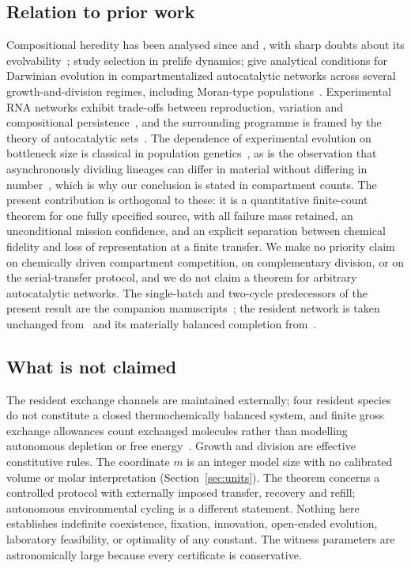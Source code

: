 \documentclass[11pt,a4paper]{article}
\theoremstyle{plain}
\theoremstyle{definition}
\theoremstyle{remark}
\begin{document}
\subsection{Relation to prior work}

Compositional heredity has been analysed since \citet{segre2000} and
\citet{szathmary1987}, with sharp doubts about its
evolvability~\citep{vasas2010,vasas2012}; \citet{nowak2008} study selection in
prelife dynamics; \citet{matsubara2026} give analytical conditions for Darwinian
evolution in compartmentalized autocatalytic networks across several
growth-and-division regimes, including Moran-type populations~\citep{moran1958}.
Experimental RNA networks exhibit trade-offs between reproduction, variation and
compositional persistence~\citep{ameta2021}, and the surrounding programme is
framed by the theory of autocatalytic
sets~\citep{kauffman1986,hordijk2004,blokhuis2020}. The dependence of
experimental evolution on bottleneck size is classical in population
genetics~\citep{wahl2001,wahl2002}, as is the observation that asynchronously
dividing lineages can differ in material without differing in
number~\citep{powell1956}, which is why our conclusion is stated in compartment
counts. The present contribution is orthogonal to these: it is a quantitative
finite-count theorem for one fully specified source, with all failure mass
retained, an unconditional mission confidence, and an explicit separation
between chemical fidelity and loss of representation at a finite transfer. We
make no priority claim on chemically driven compartment competition, on
complementary division, or on the serial-transfer protocol, and we do not claim
a theorem for arbitrary autocatalytic networks. The single-batch and two-cycle
predecessors of the present result are the companion
manuscripts~\citep{batch2026,serial2026}; the resident network is taken
unchanged from~\citep{copying2026} and its materially balanced completion
from~\citep{thermo2026}.

\subsection{What is not claimed}

The resident exchange channels are maintained externally; four resident species
do not constitute a closed thermochemically balanced system, and finite gross
exchange allowances count exchanged molecules rather than modelling autonomous
depletion or free energy~\citep{polettini2014,rao2016}. Growth and division are
effective constitutive rules. The coordinate $m$ is an integer model size with
no calibrated volume or molar interpretation (Section~\ref{sec:units}). The
theorem concerns a controlled protocol with externally imposed transfer,
recovery and refill; autonomous environmental cycling is a different statement.
Nothing here establishes indefinite coexistence, fixation, innovation,
open-ended evolution, laboratory feasibility, or optimality of any constant.
The witness parameters are astronomically large because every certificate is
conservative.
\end{document}
